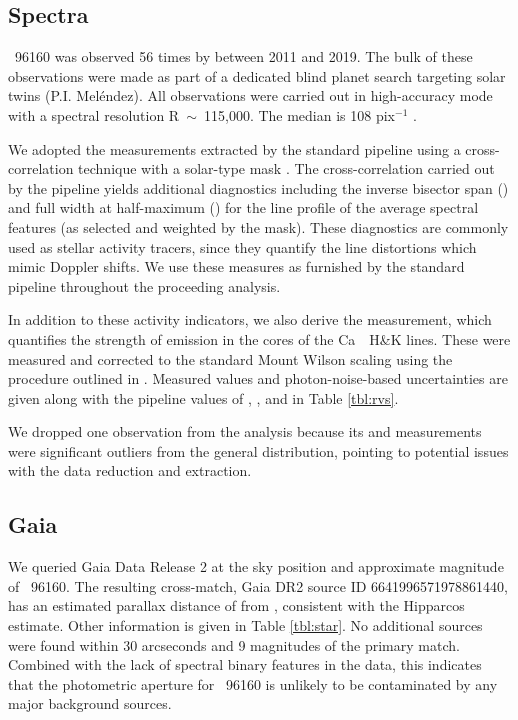 \documentclass[modern]{aastex62}
\newcommand{\hoststar}{\acronym{HIP}\ 96160\xspace}
\begin{document}
\subsection{Spectra}
\label{s:data:rvs}

\hoststar was observed 56 times by \HARPS between 2011 and 2019. 
The bulk of these observations were made as part of a dedicated blind planet search targeting solar twins (P.I. Mel\'endez). 
All observations were carried out in high-accuracy mode with a spectral resolution R~$\sim$~115,000. 
The median \SNR is 108 pix$^{-1}$ . 

We adopted the \RV measurements extracted by the standard \HARPS pipeline using a cross-correlation technique with a solar-type mask \citep{Pepe2002}. 
The cross-correlation carried out by the pipeline yields additional diagnostics including the inverse bisector span (\BIS) and full width at half-maximum (\FWHM) for the line profile of the average spectral features (as selected and weighted by the mask). 
These diagnostics are commonly used as stellar activity tracers, since they quantify the line distortions which mimic Doppler shifts. 
We use these measures as furnished by the standard pipeline throughout the proceeding analysis.

In addition to these activity indicators, we also derive the \shk measurement, which quantifies the strength of emission in the cores of the Ca~\II~H\&K lines.
These were measured and corrected to the standard Mount Wilson scaling using the procedure outlined in \citet{Lovis2009}. 
Measured \shk values and photon-noise-based uncertainties are given along with the pipeline values of \RV, \BIS, and \FWHM in Table \ref{tbl:rvs}.

We dropped one observation from the analysis because its \BIS and \FWHM measurements were significant outliers from the general distribution, pointing to potential issues with the data reduction and \RV extraction.

\subsection{Gaia}

We queried Gaia Data Release 2 \citep{gaia} at the sky position and approximate magnitude of \hoststar. 
The resulting cross-match, Gaia DR2 source ID 6641996571978861440, has an estimated parallax distance of  from \citet{BailerJones}, consistent with the Hipparcos estimate. 
Other \gaia information is given in Table \ref{tbl:star}. 
No additional sources were found within 30 arcseconds and 9 magnitudes of the primary match.
Combined with the lack of spectral binary features in the \HARPS data, this indicates that the \TESS photometric aperture for \hoststar is unlikely to be contaminated by any major background sources.
\end{document}
